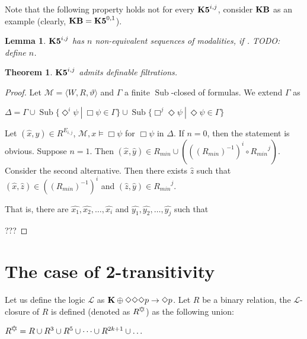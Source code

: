 \documentclass[a4paper]{article}
\theoremstyle{defin}
\theoremstyle{theorem}
\newtheorem{theorem}{Theorem}
\theoremstyle{prop}
\theoremstyle{lemma}
\newtheorem{lemma}{Lemma}
\theoremstyle{fact}
\theoremstyle{ex}
\theoremstyle{col}
\theoremstyle{claim}
\begin{document}
Note that the following property holds not for every ${\bf K5}^{i,j}$, consider ${\bf KB}$ as an example (clearly, ${\bf KB} = {\bf K5}^{0,1}$).

\begin{lemma}
${\bf K5}^{i,j}$ has $n$ non-equivalent sequences of modalities, if . TODO: define $n$.
\end{lemma}

\begin{theorem}
  ${\bf K5}^{i,j}$ admits definable filtrations.
\end{theorem}

\begin{proof}
  Let $\mathcal{M} = \langle W, R, \vartheta \rangle$ and $\Gamma$ a finite $\operatorname{Sub}$-closed of formulas. We extend $\Gamma$ as
  \begin{center}
    $\Delta = \Gamma \cup \operatorname{Sub}\{  \Diamond^{i} \psi \: | \: \Box \psi \in \Gamma \} \cup \operatorname{Sub}\{ \Box^{j} \Diamond \psi \: | \: \Diamond \psi \in \Gamma \}$
  \end{center}
  Let $(\hat{x}, \hat{y}) \in R^{E_{i,j}}$, $\mathcal{M}, x \models \Box \psi$ for $\Box \psi$ in $\Delta$.
  If $n = 0$, then the statement is obvious. Suppose $n = 1$.
  Then $(\hat{x}, \hat{y}) \in R_{min} \cup (((R_{min})^{-1})^i \circ {R_{min}}^j)$. Consider the second alternative. Then there exists $\hat{z}$ such that $(\hat{x}, \hat{z}) \in ((R_{min})^{-1})^i $ and $(\hat{z}, \hat{y}) \in {R_{min}}^j$.

  That is, there are $\hat{x_1}, \hat{x_2}, \dots, \hat{x_i}$ and $\hat{y_1}, \hat{y_2}, \dots, \hat{y_j}$ such that


  ???
\end{proof}

\section{The case of 2-transitivity}


Let us define the logic $\mathcal{L}$ as ${\bf K} \oplus \Diamond \Diamond \Diamond p \to \Diamond p$. Let $R$ be a binary relation, the $\mathcal{L}$-closure of $R$ is defined (denoted as $R^{\davidsstar}$) as the following union:
\begin{center}
  $R^{\davidsstar} = R \cup R^3 \cup R^5 \cup \dots \cup R^{2k+1} \cup \dots$
\end{center}
\end{document}
